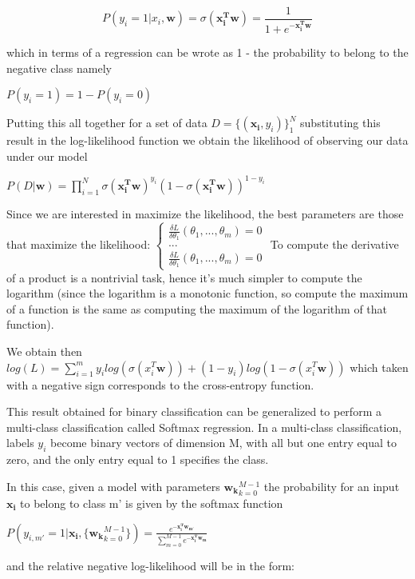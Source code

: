 \documentclass[a4paper,11pt]{article}
\begin{document}
\begin{equation}
 P(y_i = 1 | x_i, \mathbf{w}) = \sigma(\mathbf{x_i^T w}) = \frac{1}{1+e^{-\mathbf{x_i^T w}}}
\end{equation}

which in terms of a regression can be wrote as 1 - the probability to belong to the negative class namely

$P(y_i = 1) = 1 - P(y_i = 0)$

Putting this all together for a set of data $D = \{ (\mathbf{x_i}, y_i)\}_1 ^N$ substituting this result in the log-likelihood function we obtain the likelihood of observing our data under our model

$P(D|\mathbf{w}) = \prod_{i=1}^N \sigma(\mathbf{x_i^T w})^{y_i} (1-\sigma(\mathbf{x_i^T w}))^{1-y_i}$

Since we are interested in maximize the likelihood, the best parameters are those that maximize the likelihood:
$\begin{cases} \frac{\delta L}{\delta \theta_1}(\theta_1, ..., \theta_m) = 0 \\ ... \\ \frac{\delta L}{\delta \theta_1}(\theta_1, ..., \theta_m) = 0 \end{cases}$
To compute the derivative of a product is a nontrivial task, hence it's much simpler to compute the logarithm (since the logarithm is a monotonic function, so compute the maximum of a function is the same as computing the maximum of the logarithm of that function).

We obtain then $log(L) = \sum_{i=1}^m y_i log(\sigma(x_i^T \mathbf{w})) + (1-y_i)log(1-\sigma(x_i^T \mathbf{w}))$ which taken with a negative sign corresponds to the cross-entropy function.


This result obtained for binary classification can be generalized to perform a multi-class classification called Softmax regression.
In a multi-class classification, labels $y_i$ become binary vectors of dimension M, with all but one entry equal to zero, and the only entry equal to 1 specifies the class.

In this case, given a model with parameters $\mathbf{w_k}_{k=0}^{M-1}$ the probability for an input $\mathbf{x_i}$ to belong to class m' is given by the softmax function

$P(y_{i,m'}= 1 | \mathbf{x_i}, \{\mathbf{w_k}_{k=0}^{M-1}\} ) = \frac{e^{-\mathbf{x_i^T w_{m'}}} }{\sum_{m = 0}^{M-1} e^{-\mathbf{x_i^T w_{m}}}}$

and the relative negative log-likelihood will be in the form:
\end{document}
